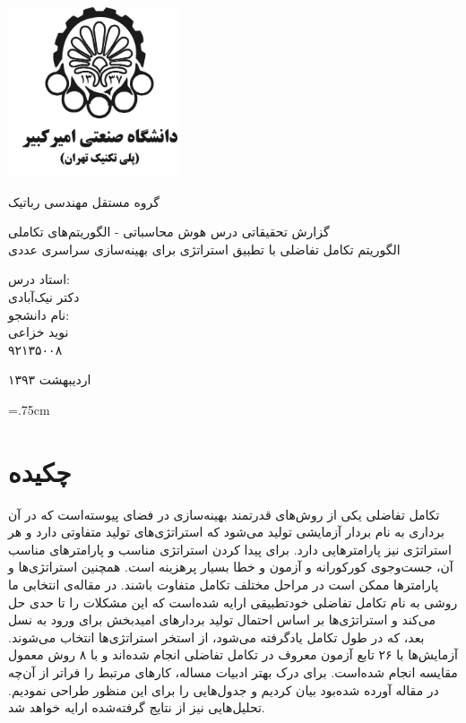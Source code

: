 \documentclass[12pt,a4paper]{article}
\newcommand{\nocontentsline}[3]{}
\newcommand{\tocless}[2]{\bgroup\let\addcontentsline=\nocontentsline#1{#2}\egroup}
\theoremstyle{definition}
\theoremstyle{theorem}
\theoremstyle{definition}
\begin{document}
\thispagestyle{empty}
\vspace*{-28mm}
\centerline{\includegraphics[height=5cm]{logo.png}}

\begin{center}
\vspace{-2mm}
{\large \titr
گروه مستقل مهندسی رباتیک
\\[2.1cm]
}

{\large \titr
گزارش تحقیقاتی درس هوش محاسباتی - الگوریتم‌های تکاملی
\\[2cm]
{\Large
الگوریتم‌ تکامل تفاضلی با تطبیق استراتژی برای بهینه‌سازی سراسری عددی
\\[2cm]
}

استاد درس:
\\[.5cm]
{\Large
دکتر نیک‌آبادی}
\\[1.5cm]
\large 
نام دانشجو:
\\[.5cm]
{\Large
نوید خزاعی}
\\[.5cm]
۹۲۱۳۵۰۰۸
\\[1.5cm]
}
\baselineskip=1cm

{\large
اردیبهشت ۱۳۹۳
}
\end{center}

\newpage
\baselineskip=1cm

\baselineskip=.75cm
\newpage 
{}
\tocless {\section*}{چکیده}

تکامل تفاضلی یکی از روش‌های قدرتمند بهینه‌سازی در فضای پیوسته‌است که در آن برداری به نام بردار آزمایشی تولید می‌شود که استراتژی‌های تولید متفاوتی دارد و هر استراتژی نیز پارامترهایی دارد. برای پیدا کردن استراتژی مناسب و پارامترهای مناسب آن، جست‌وجوی کورکورانه و آزمون و خطا بسیار پرهزینه است. همچنین استراتژی‌ها و پارامترها ممکن است در مراحل مختلف تکامل متفاوت باشند. در مقاله‌ی انتخابی ما روشی به نام تکامل تفاضلی خودتطبیقی ارایه شده‌است که این مشکلات را تا حدی حل می‌کند و استراتژی‌ها بر اساس احتمال تولید بردارهای امیدبخش برای ورود به نسل بعد، که در طول تکامل یادگرفته می‌شود، از استخر استراتژی‌ها انتخاب می‌شوند. آزمایش‌ها با ۲۶ تابع آزمون معروف در تکامل تفاضلی انجام شده‌اند و با ۸ روش معمول مقایسه انجام شده‌است. برای درک بهتر ادبیات مساله، کارهای مرتبط را فراتر از آن‌چه در مقاله آورده شده‌بود بیان کردیم و جدول‌هایی را برای این منظور طراحی نمودیم. تحلیل‌هایی نیز از نتایج گرفته‌شده ارایه خواهد شد.
\end{document}
